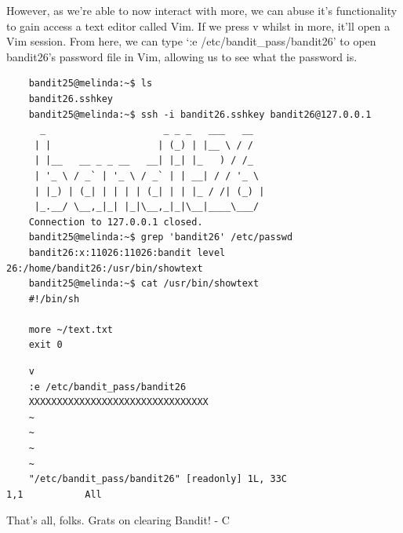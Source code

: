 \documentclass[11pt]{article}
\begin{document}
However, as we're able to now interact with more, we can abuse it's functionality to gain access a text editor called Vim. If we press v whilst in more, it'll open a Vim session. From here, we can type `:e /etc/bandit\_pass/bandit26' to open bandit26's password file in Vim, allowing us to see what the password is.
\begin{lstlisting}
	bandit25@melinda:~$ ls                                       
	bandit26.sshkey
	bandit25@melinda:~$ ssh -i bandit26.sshkey bandit26@127.0.0.1
	  _                     _ _ _   ___   __  
	 | |                   | (_) | |__ \ / /  
	 | |__   __ _ _ __   __| |_| |_   ) / /_  
	 | '_ \ / _` | '_ \ / _` | | __| / / '_ \ 
	 | |_) | (_| | | | | (_| | | |_ / /| (_) |
	 |_.__/ \__,_|_| |_|\__,_|_|\__|____\___/ 
	Connection to 127.0.0.1 closed.
	bandit25@melinda:~$ grep 'bandit26' /etc/passwd 
	bandit26:x:11026:11026:bandit level 26:/home/bandit26:/usr/bin/showtext
	bandit25@melinda:~$ cat /usr/bin/showtext
	#!/bin/sh

	more ~/text.txt
	exit 0
\end{lstlisting}

\begin{lstlisting}
	v
	:e /etc/bandit_pass/bandit26
	XXXXXXXXXXXXXXXXXXXXXXXXXXXXXXXX
	~                                                                                 
	~                                                                                 
	~                                                                                 
	~                                                                                 
	"/etc/bandit_pass/bandit26" [readonly] 1L, 33C                  1,1           All
\end{lstlisting}

That's all, folks. Grats on clearing Bandit! - C
\end{document}
